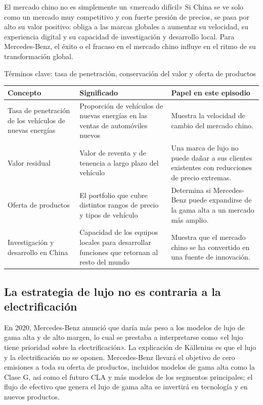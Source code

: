 \begin{importantbox}{El mercado chino no es simplemente un «mercado difícil»}
Si China se ve solo como un mercado muy competitivo y con fuerte presión de precios, se pasa por alto su valor positivo: obliga a las marcas globales a aumentar su velocidad, su experiencia digital y su capacidad de investigación y desarrollo local. Para Mercedes-Benz, el éxito o el fracaso en el mercado chino influye en el ritmo de su transformación global.
\end{importantbox}

\begin{knowledgebox}{Términos clave: tasa de penetración, conservación del valor y oferta de productos}
\noindent\begin{tabularx}{\textwidth}{p{}p{}X}
\toprule
Concepto & Significado & Papel en este episodio \\
\midrule
Tasa de penetración de los vehículos de nuevas energías & Proporción de vehículos de nuevas energías en las ventas de automóviles nuevos & Muestra la velocidad de cambio del mercado chino. \\
Valor residual & Valor de reventa y de tenencia a largo plazo del vehículo & Una marca de lujo no puede dañar a sus clientes existentes con reducciones de precio extremas. \\
Oferta de productos & El portfolio que cubre distintos rangos de precio y tipos de vehículo & Determina si Mercedes-Benz puede expandirse de la gama alta a un mercado más amplio. \\
Investigación y desarrollo en China & Capacidad de los equipos locales para desarrollar funciones que retornan al resto del mundo & Muestra que el mercado chino se ha convertido en una fuente de innovación. \\
\bottomrule
\end{tabularx}
\end{knowledgebox}

\subsection{La estrategia de lujo no es contraria a la electrificación}

En 2020, Mercedes-Benz anunció que daría más peso a los modelos de lujo de gama alta y de alto margen, lo cual se prestaba a interpretarse como «el lujo tiene prioridad sobre la electrificación». La explicación de Källenius es que el lujo y la electrificación no se oponen. Mercedes-Benz llevará el objetivo de cero emisiones a toda su oferta de productos, incluidos modelos de gama alta como la Clase G, así como el futuro CLA y más modelos de los segmentos principales; el flujo de efectivo que genera el lujo de gama alta se invertirá en tecnología y en nuevos productos.

